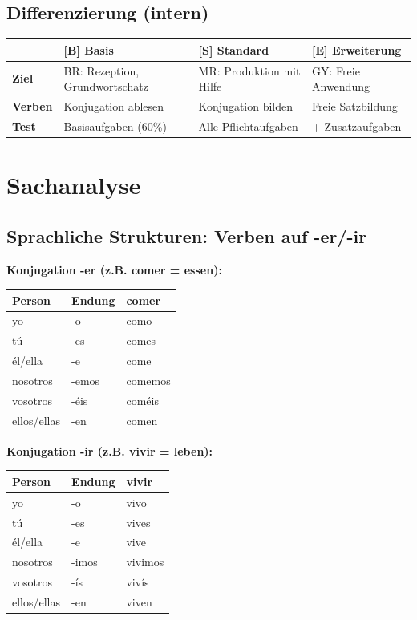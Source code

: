 \documentclass[11pt,a4paper]{article}
\newcommand{\B}{\textcolor{basis}{\textbf{[B]}}}
\newcommand{\Std}{\textcolor{standard}{\textbf{[S]}}}
\newcommand{\E}{\textcolor{erweiterung}{\textbf{[E]}}}
\begin{document}
\subsection{Differenzierung (intern)}
\begin{tabular}{|l|p{3.5cm}|p{3.5cm}|p{3.5cm}|}
\hline
& \B{} \textbf{Basis} & \Std{} \textbf{Standard} & \E{} \textbf{Erweiterung} \\
\hline
\textbf{Ziel} & BR: Rezeption, Grundwortschatz & MR: Produktion mit Hilfe & GY: Freie Anwendung \\
\hline
\textbf{Verben} & Konjugation ablesen & Konjugation bilden & Freie Satzbildung \\
\hline
\textbf{Test} & Basisaufgaben (60\%) & Alle Pflichtaufgaben & + Zusatzaufgaben \\
\hline
\end{tabular}

\section{Sachanalyse}

\subsection{Sprachliche Strukturen: Verben auf -er/-ir}

\textbf{Konjugation -er (z.B. comer = essen):}
\begin{center}
\begin{tabular}{|l|l|l|}
\hline
\textbf{Person} & \textbf{Endung} & \textbf{comer} \\
\hline
yo & -o & como \\
tú & -es & comes \\
él/ella & -e & come \\
nosotros & -emos & comemos \\
vosotros & -éis & coméis \\
ellos/ellas & -en & comen \\
\hline
\end{tabular}
\end{center}

\textbf{Konjugation -ir (z.B. vivir = leben):}
\begin{center}
\begin{tabular}{|l|l|l|}
\hline
\textbf{Person} & \textbf{Endung} & \textbf{vivir} \\
\hline
yo & -o & vivo \\
tú & -es & vives \\
él/ella & -e & vive \\
nosotros & -imos & vivimos \\
vosotros & -ís & vivís \\
ellos/ellas & -en & viven \\
\hline
\end{tabular}
\end{center}
\end{document}
